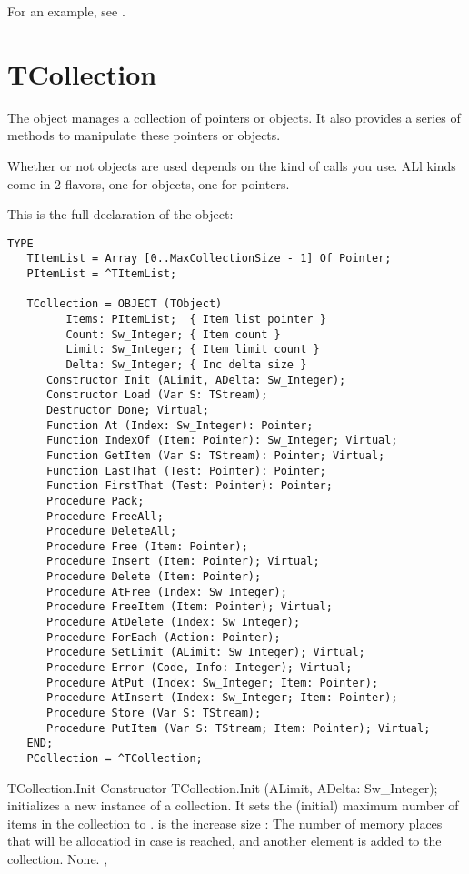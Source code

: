 For an example, see .

\section{TCollection}
\label{se:TCollection}

The  object manages a collection of pointers or objects. 
It also provides a series of methods to manipulate these pointers or 
objects.

Whether or not objects are used depends on the kind of calls you use.
ALl kinds come in 2 flavors, one for objects, one for pointers.

This is the full declaration of the  object:

\begin{verbatim}
TYPE
   TItemList = Array [0..MaxCollectionSize - 1] Of Pointer;
   PItemList = ^TItemList;

   TCollection = OBJECT (TObject)
         Items: PItemList;  { Item list pointer }
         Count: Sw_Integer; { Item count }
         Limit: Sw_Integer; { Item limit count }
         Delta: Sw_Integer; { Inc delta size }
      Constructor Init (ALimit, ADelta: Sw_Integer);
      Constructor Load (Var S: TStream);
      Destructor Done; Virtual;
      Function At (Index: Sw_Integer): Pointer;
      Function IndexOf (Item: Pointer): Sw_Integer; Virtual;
      Function GetItem (Var S: TStream): Pointer; Virtual;
      Function LastThat (Test: Pointer): Pointer;
      Function FirstThat (Test: Pointer): Pointer;
      Procedure Pack;
      Procedure FreeAll;
      Procedure DeleteAll;
      Procedure Free (Item: Pointer);
      Procedure Insert (Item: Pointer); Virtual;
      Procedure Delete (Item: Pointer);
      Procedure AtFree (Index: Sw_Integer);
      Procedure FreeItem (Item: Pointer); Virtual;
      Procedure AtDelete (Index: Sw_Integer);
      Procedure ForEach (Action: Pointer);
      Procedure SetLimit (ALimit: Sw_Integer); Virtual;
      Procedure Error (Code, Info: Integer); Virtual;
      Procedure AtPut (Index: Sw_Integer; Item: Pointer);
      Procedure AtInsert (Index: Sw_Integer; Item: Pointer);
      Procedure Store (Var S: TStream);
      Procedure PutItem (Var S: TStream; Item: Pointer); Virtual;
   END;
   PCollection = ^TCollection;
\end{verbatim}


\begin{procedure}{TCollection.Init}
\Declaration
Constructor TCollection.Init (ALimit, ADelta: Sw\_Integer);
\Description
{} initializes a new instance of a collection. It sets the (initial) maximum number
of items in the collection to .  is the increase
size : The number of memory places that will be allocatiod in case  is reached, 
and another element is added to the collection.
\Errors
None. 
\SeeAlso
{}, 
\end{procedure}

